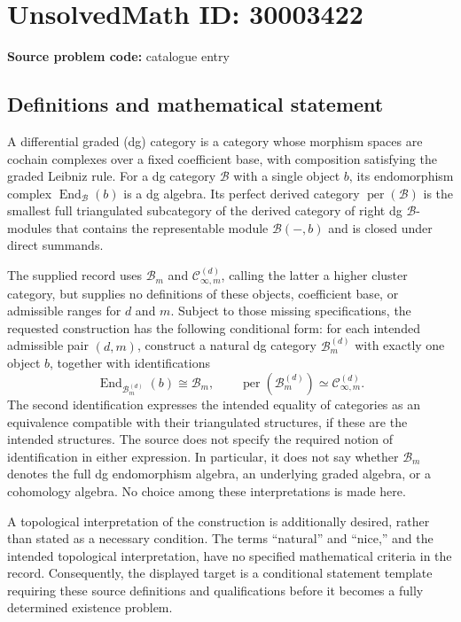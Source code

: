 \documentclass[11pt]{article}
\begin{document}
\section*{UnsolvedMath ID: 30003422}
\textbf{Source problem code:} catalogue entry
\subsection{Definitions and mathematical statement}
A differential graded (dg) category is a category whose morphism spaces are cochain complexes over a fixed coefficient base, with composition satisfying the graded Leibniz rule. For a dg category \(\mathcal B\) with a single object \(b\), its endomorphism complex \(\operatorname{End}_{\mathcal B}(b)\) is a dg algebra. Its perfect derived category \(\operatorname{per}(\mathcal B)\) is the smallest full triangulated subcategory of the derived category of right dg \(\mathcal B\)-modules that contains the representable module \(\mathcal B(-,b)\) and is closed under direct summands.

The supplied record uses \(\mathcal B_m\) and \(\mathcal C^{(d)}_{\infty,m}\), calling the latter a higher cluster category, but supplies no definitions of these objects, coefficient base, or admissible ranges for \(d\) and \(m\). Subject to those missing specifications, the requested construction has the following conditional form: for each intended admissible pair \((d,m)\), construct a natural dg category \(\mathcal B^{(d)}_m\) with exactly one object \(b\), together with identifications
\[
\operatorname{End}_{\mathcal B^{(d)}_m}(b)\cong\mathcal B_m,
\qquad
\operatorname{per}\!\left(\mathcal B^{(d)}_m\right)\simeq\mathcal C^{(d)}_{\infty,m}.
\]
The second identification expresses the intended equality of categories as an equivalence compatible with their triangulated structures, if these are the intended structures. The source does not specify the required notion of identification in either expression. In particular, it does not say whether \(\mathcal B_m\) denotes the full dg endomorphism algebra, an underlying graded algebra, or a cohomology algebra. No choice among these interpretations is made here.

A topological interpretation of the construction is additionally desired, rather than stated as a necessary condition. The terms ``natural'' and ``nice,'' and the intended topological interpretation, have no specified mathematical criteria in the record. Consequently, the displayed target is a conditional statement template requiring these source definitions and qualifications before it becomes a fully determined existence problem.
\end{document}
